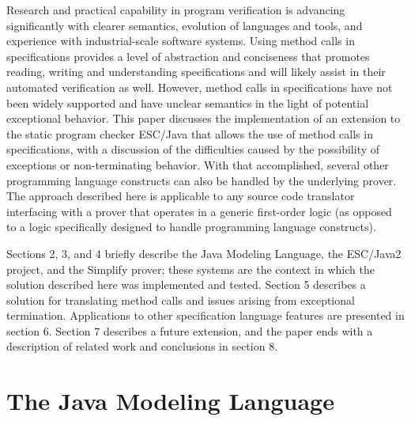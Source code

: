 \documentclass{sig-alternate}
\begin{document}
Research and practical capability in program verification is advancing
significantly with clearer semantics, evolution of languages and tools,
and experience with industrial-scale software systems.
Using method calls in specifications provides a level of abstraction 
and conciseness that
promotes reading, writing and understanding specifications and will 
likely assist in their automated verification as well.  However, method
calls in specifications have not been widely supported and have
unclear semantics in the light of potential exceptional behavior.
This paper discusses the implementation
of an extension to the static program checker ESC/Java that allows the use of method calls in
specifications, with a discussion of the difficulties caused by the possibility of exceptions or
non-terminating behavior.  With that accomplished, several other programming
language constructs can also be handled by the underlying prover.
The approach described here is applicable to any source code translator
interfacing with a prover that operates in a generic first-order 
logic (as opposed to a logic specifically designed to handle programming language
constructs).

Sections 2, 3, and 4 briefly describe the Java Modeling
Language, the ESC/Java2 project, and the Simplify prover; these systems
are the context in which the solution described here was implemented 
and tested.  Section 5 describes a solution for translating method calls and issues 
arising from exceptional termination.
Applications to other specification language features are presented in section 6.
Section 7 describes a future extension,
and the paper ends with a description of related work and conclusions in section 8.


\section{The Java Modeling Language}
\end{document}
